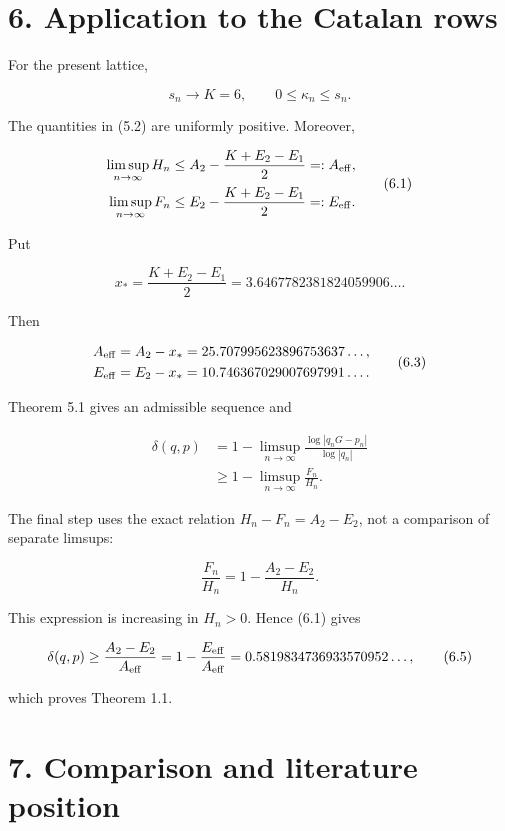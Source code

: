 \documentclass[
  11pt,
]{article}
\begin{document}
\hypertarget{application-to-the-catalan-rows}{%
\section{6. Application to the Catalan
rows}\label{application-to-the-catalan-rows}}

For the present lattice,

\[
 s_n\to K=6,\qquad 0\le\kappa_n\le s_n.
\]

The quantities in (5.2) are uniformly positive. Moreover,

\[
\begin{aligned}
 \limsup_{n\to\infty}H_n
 &\le A_2-\frac{K+E_2-E_1}{2}=:A_{\rm eff},\\
 \limsup_{n\to\infty}F_n
 &\le E_2-\frac{K+E_2-E_1}{2}=:E_{\rm eff}.
\end{aligned}                                        \tag{6.1}
\]

Put

\[
 x_*=\frac{K+E_2-E_1}{2}
     =3.6467782381824059906\ldots.                   \tag{6.2}
\]

Then

\[
\begin{aligned}
 A_{\rm eff}&=A_2-x_*
 =25.707995623896753637\ldots,\\
 E_{\rm eff}&=E_2-x_*
 =10.746367029007697991\ldots.
\end{aligned}                                        \tag{6.3}
\]

Theorem 5.1 gives an admissible sequence and

\[
\begin{aligned}
 \delta(q,p)
 &=1-\limsup_{n\to\infty}
       \frac{\log|q_nG-p_n|}{\log|q_n|}\\
 &\ge1-\limsup_{n\to\infty}\frac{F_n}{H_n}.
\end{aligned}                                        \tag{6.4}
\]

The final step uses the exact relation \(H_n-F_n=A_2-E_2\), not a
comparison of separate limsups:

\[
 \frac{F_n}{H_n}=1-\frac{A_2-E_2}{H_n}.
\]

This expression is increasing in \(H_n>0\). Hence (6.1) gives

\[
 \delta(q,p)\ge
 \frac{A_2-E_2}{A_{\rm eff}}
 =1-\frac{E_{\rm eff}}{A_{\rm eff}}
 =0.5819834736933570952\ldots,                       \tag{6.5}
\]

which proves Theorem 1.1.

\hypertarget{comparison-and-literature-position}{%
\section{7. Comparison and literature
position}\label{comparison-and-literature-position}}
\end{document}
